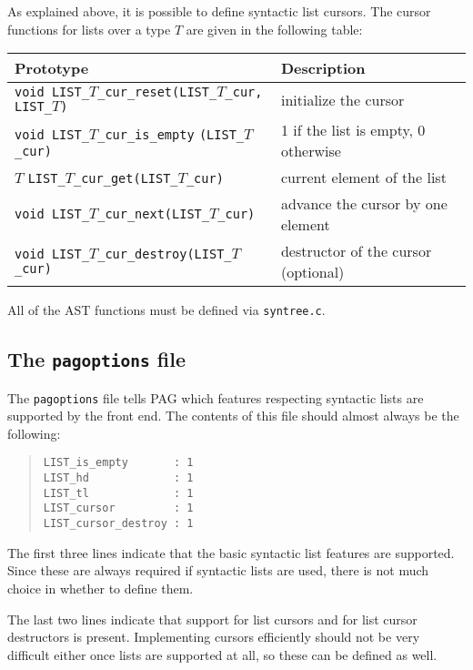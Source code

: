 As explained above, it is possible to define syntactic list cursors.
The cursor functions for lists over a type \(T\) are given in the
following table:

\begin{longtable}{|p{} | p{}|}
\hline
Prototype & Description \\
\hline
\hline
\verb|void LIST_|\(T\)\verb|_cur_reset(LIST_|\(T\)\verb|_cur,|
    \verb|LIST_|\(T\)\verb|)|
    & initialize the cursor \\
\hline
\raggedright
    \verb|void LIST_|\(T\)\verb|_cur_is_empty|
    \verb|(LIST_|\(T\)\verb|_cur)|
    & 1 if the list is empty, 0 otherwise \\
\hline
\(T\) \verb|LIST_|\(T\)\verb|_cur_get(LIST_|\(T\)\verb|_cur)|
    & current element of the list \\
\hline
\verb|void LIST_|\(T\)\verb|_cur_next(LIST_|\(T\)\verb|_cur)|
    & advance the cursor by one element \\
\hline
\verb|void LIST_|\(T\)\verb|_cur_destroy(LIST_|\(T\)\verb|_cur)|
    & destructor of the cursor (optional) \\
\hline
\end{longtable}

All of the AST functions must be defined via \verb|syntree.c|.

\subsection{The {\tt pagoptions} file}

The \verb|pagoptions| file tells PAG which features respecting
syntactic lists are supported by the front end. The contents of this
file should almost always be the following:

\begin{quote}
\begin{verbatim}
LIST_is_empty       : 1
LIST_hd             : 1
LIST_tl             : 1
LIST_cursor         : 1 
LIST_cursor_destroy : 1
\end{verbatim}
\end{quote}

The first three lines indicate that the basic syntactic list
features are supported. Since these are always required if syntactic
lists are used, there is not much choice in whether to define them.

The last two lines indicate that support for list cursors and for
list cursor destructors is present. Implementing cursors efficiently
should not be very difficult either once lists are supported at all,
so these can be defined as well.


